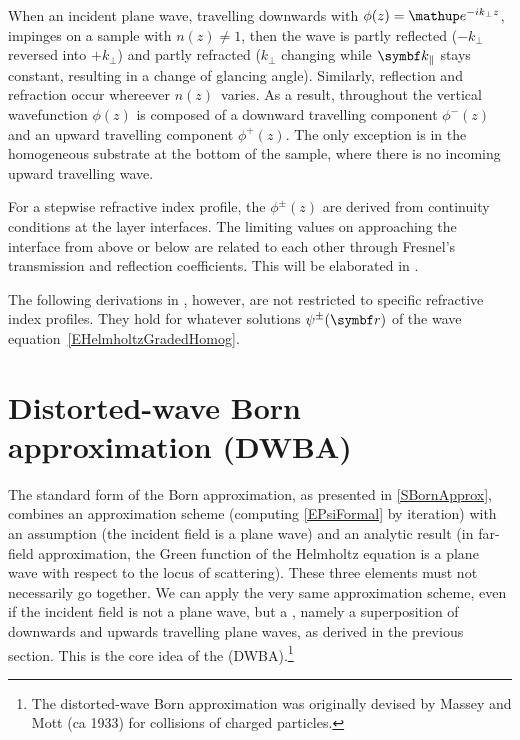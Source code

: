 When an incident plane wave,
travelling downwards with
$\phi(z)=\e^{-ik_\perp z}$,
%
impinges on a sample with $n(z)\ne 1$,
then the wave is partly reflected ($-k_\perp$ reversed into $+k_\perp$)
and partly refracted
($k_\perp$ changing while $\k_\parallel$ stays constant,
resulting in a change of glancing angle).
Similarly, reflection and refraction occur
whereever $n(z)$~varies.
As a result, throughout the vertical wavefunction $\phi(z)$ is composed of a
downward travelling component $\phi^-(z)$
and an upward travelling component $\phi^+(z)$.
The only exception is in the homogeneous substrate at the bottom of the sample,
where there is no incoming upward travelling wave.

For a stepwise refractive index profile,
the $\phi^\pm(z)$ are derived from continuity conditions at the layer interfaces.
The limiting values on approaching the interface from above or below
are related to each other through Fresnel's
transmission and reflection coefficients.
%
This will be elaborated in .

The following derivations in , however,
are not restricted to specific refractive index profiles.
They hold for whatever solutions
$\psi^\pm(\r)$ of the wave equation~\cref{EHelmholtzGradedHomog}.


%

\section{Distorted-wave Born approximation (DWBA)}\label{SDWBA}

%
%

The standard form of the Born approximation,
as presented in \cref{SBornApprox},
combines an approximation scheme
(computing \cref{EPsiFormal} by iteration)
with an assumption (the incident field is a plane wave)
and an analytic result
(in far-field approximation,
the Green function of the Helmholtz equation is a plane wave
with respect to the locus of scattering).
These three elements must not necessarily go together.
We can apply the very same approximation scheme,
even if the incident field is not a plane wave,
but a ,
namely a superposition of downwards and upwards travelling plane waves,
as derived in the previous section.
This is the core idea
of the  (DWBA).\footnote
{The distorted-wave Born approximation
was originally devised by Massey and Mott (ca 1933)
for collisions of charged particles.}

